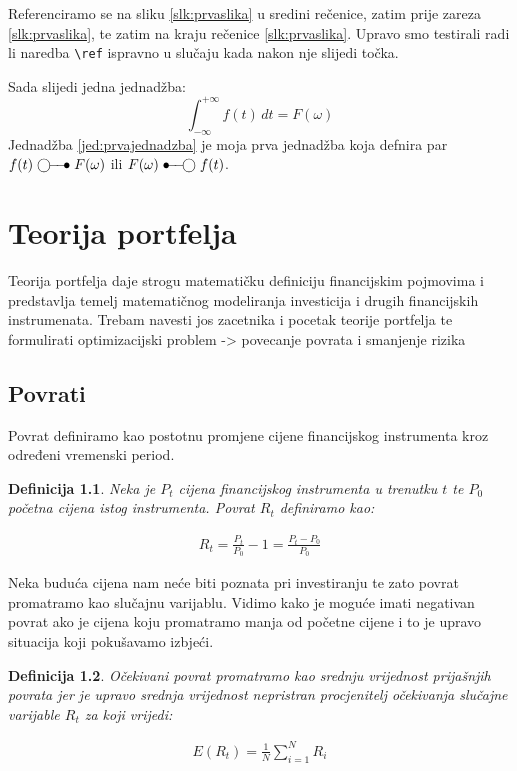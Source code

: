\documentclass[zavrsnirad]{fer}
\newtheorem{definition}{Definicija}
\begin{document}
Referenciramo se na sliku \ref{slk:prvaslika} u sredini rečenice, zatim prije zareza \ref{slk:prvaslika}, te zatim na kraju rečenice \ref{slk:prvaslika}.
Upravo smo testirali radi li naredba \verb|\ref| ispravno u slučaju kada nakon nje slijedi točka.

Sada slijedi jedna jednadžba:
\begin{equation}
  \label{jed:prvajednadzba}
  \int_{-\infty}^{+\infty}f(t)\,dt=F(\omega)
\end{equation}
Jednadžba \eqref{jed:prvajednadzba} je moja prva jednadžba koja defnira par $f(t)\ufrek F(\omega)$ ili $F(\omega)\uvrem f(t)$.

\chapter{Teorija portfelja}
\label{pog:teorija_portelja}

Teorija portfelja daje strogu matematičku definiciju
financijskim pojmovima i predstavlja temelj matematičnog
modeliranja investicija i drugih financijskih instrumenata.
Trebam navesti jos zacetnika i pocetak teorije portfelja te formulirati
optimizacijski problem -> povecanje povrata i smanjenje rizika

\section{Povrati}
\label{sek:povrati}

Povrat definiramo kao postotnu promjene cijene financijskog
instrumenta kroz određeni vremenski period.

\begin{definition}
  Neka je $P_t$ cijena financijskog instrumenta u trenutku $t$ te
  $P_0$ početna cijena istog instrumenta. Povrat $R_t$ definiramo kao:
\end{definition}
\begin{align*}R_t = \frac{P_t}{P_0} - 1 = \frac{P_t - P_0}{P_0}
\end{align*}

\noindent Neka buduća cijena nam neće biti poznata pri investiranju te zato povrat promatramo kao slučajnu varijablu.
Vidimo kako je moguće imati negativan povrat ako je cijena koju promatramo
manja od početne cijene i to je upravo situacija koji pokušavamo izbjeći.
\begin{definition}
  Očekivani povrat promatramo kao srednju vrijednost prijašnjih
  povrata jer je upravo srednja vrijednost nepristran procjenitelj 
očekivanja slučajne varijable $R_t$ za koji vrijedi:
\end{definition}
\begin{align*}
  E(R_t) =\frac{1}{N} \sum_{i = 1}^{N} R_i
\end{align*}
\end{document}
